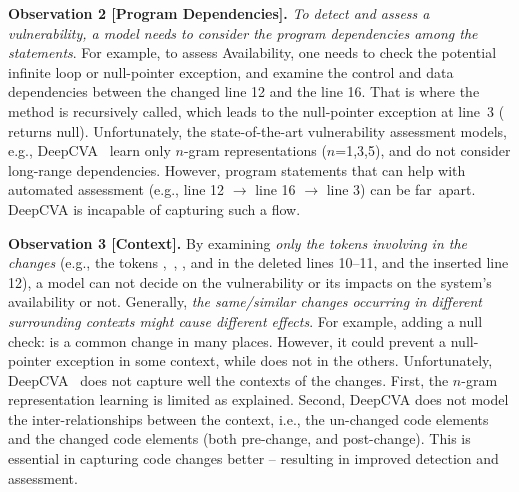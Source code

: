 \vspace{2pt} {\bf Observation 2 [Program Dependencies].}  {\em To
  detect and assess a vulnerability, a model needs to consider the
  program dependencies among the statements}. For example, to assess
Availability, one needs to check the potential infinite loop or
null-pointer exception, and examine the control and data dependencies
between the changed line 12 and the line 16. That is where the method
 is recursively called, which leads to the null-pointer
exception at line~3 ( returns
null). Unfortunately, the state-of-the-art vulnerability assessment
models, e.g., DeepCVA~\cite{deepCVA-ase21} learn only $n$-gram
representations ($n$=1,3,5), and do not consider long-range
dependencies. However, program statements that can help with automated
assessment (e.g., line 12 $\rightarrow$ line 16 $\rightarrow$ line 3) can be far~apart.
DeepCVA is incapable of capturing such a flow.

\vspace{2pt}
{\bf Observation 3 [Context].} By examining {\em only the
  tokens involving in the changes} (e.g., the tokens
,~, , and
 in the deleted lines 10--11, and the inserted line 12),
a model can not decide on the vulnerability or its impacts on the
system's availability or not. Generally, {\em the same/similar changes
  occurring in different surrounding contexts might cause different
  effects}.
For example, adding a null check:  is a common
change in many places. However, it could prevent a null-pointer
exception in some context, while does not in the others.
Unfortunately, DeepCVA~\cite{deepCVA-ase21} does not capture well the
contexts of the changes. First, the $n$-gram representation learning
is limited as explained.
%
Second, DeepCVA does not model the inter-relationships between the
context, i.e., the un-changed code elements and the changed code
elements (both pre-change, and post-change).  This is essential in
capturing code changes better -- resulting in
improved detection and assessment.

